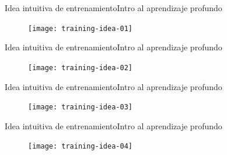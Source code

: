 \documentclass[10pt,border=3pt,tikz]{beamer}
\begin{document}
    \begin{frame}{Idea intuitiva de entrenamiento}{Intro al aprendizaje profundo}
        \begin{figure}
            \centering
            \texttt{[image: training-idea-01]}
        \end{figure}
    \end{frame}
    
    \begin{frame}{Idea intuitiva de entrenamiento}{Intro al aprendizaje profundo}
    \begin{figure}
        \centering
        \texttt{[image: training-idea-02]}
    \end{figure}
    \end{frame}
    
    \begin{frame}{Idea intuitiva de entrenamiento}{Intro al aprendizaje profundo}
    \begin{figure}
        \centering
        \texttt{[image: training-idea-03]}
    \end{figure}
    \end{frame}
    
    \begin{frame}{Idea intuitiva de entrenamiento}{Intro al aprendizaje profundo}
        \begin{figure}
            \centering
            \texttt{[image: training-idea-04]}
        \end{figure}
    \end{frame}
    
\end{document}
